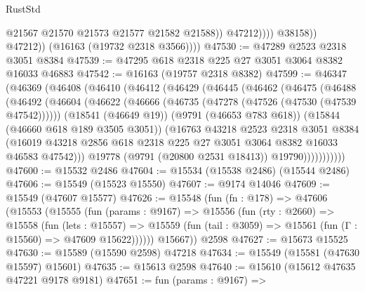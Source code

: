\begin{lexlean}{RustStd}
\begin{coremodule}
                            @21567
                            @21570
                            @21573
                            @21577
                            @21582
                            @21588))
                        @47212))))
                @38158))
            @47212))
        (@16163 (@19732 @2318 @3566))))
@47530 := @47289 @2523 @2318 @3051 @8384
@47539 := @47295 @618 @2318 @225 @27 @3051 @3064 @8382 @16033 @46883
@47542 := @16163 (@19757 @2318 @8382)
@47599 := @46347
    (@46369
      (@46408
        (@46410
          (@46412
            (@46429
              (@46445
                (@46462
                  (@46475
                    (@46488
                      (@46492
                        (@46604
                          (@46622
                            (@46666 (@46735 (@47278 (@47526 (@47530 (@47539 @47542))))))
                            (@18541 (@46649 @19))
                            (@9791 (@46653 @783 @618))
                            (@15844 (@46660 @618 @189 @3505 @3051))
                            (@16763
                              @43218
                              @2523
                              @2318
                              @3051
                              @8384
                              (@16019
                                @43218
                                @2856
                                @618
                                @2318
                                @225
                                @27
                                @3051
                                @3064
                                @8382
                                @16033
                                @46583
                                @47542)))
                          @19778
                          (@9791 (@20800 @2531 @18413))
                          @19790)))))))))))
@47600 := @15532 @2486
@47604 := @15534 (@15538 @2486) (@15544 @2486)
@47606 := @15549 (@15523 @15550)
@47607 := @9174 @14046
@47609 := @15549 (@47607 @15577)
@47626 := @15548
    (fun (fn : @178) =>
    @47606
      (@15553
        (@15555
          (fun (params : @9167) =>
          @15556
            (fun (rty : @2660) =>
            @15558
              (fun (lets : @15557) =>
              @15559 (fun (tail : @3059) => @15561 (fun (Γ : @15560) => @47609 @15622))))))
        @15667))
    @2598
@47627 := @15673 @15525
@47630 := @15589 (@15590 @2598) @47218
@47634 := @15549 (@15581 (@47630 @15597) @15601)
@47635 := @15613 @2598
@47640 := @15610 (@15612 @47635 @47221 @9178 @9181)
@47651 := fun (params : @9167) =>

\end{coremodule}
\end{lexlean}
